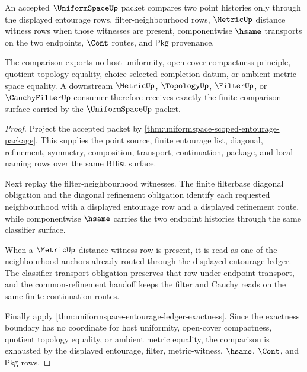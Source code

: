 \begin{theorem}
\label{thm:uniformspace-entourage-filter-metric-comparison}
An accepted $\UniformSpaceUp$ packet compares two point histories only through
the displayed entourage rows, filter-neighbourhood rows, $\MetricUp$ distance
witness rows when those witnesses are present, componentwise $\hsame$
transports on the two endpoints, $\Cont$ routes, and $\mathsf{Pkg}$
provenance.

The comparison exports no host uniformity, open-cover compactness principle,
quotient topology equality, choice-selected completion datum, or ambient
metric space equality. A downstream $\MetricUp$, $\TopologyUp$, $\FilterUp$,
or $\CauchyFilterUp$ consumer therefore receives exactly the finite comparison
surface carried by the $\UniformSpaceUp$ packet.
\end{theorem}
\begin{proof}
Project the accepted packet by
\autoref{thm:uniformspace-scoped-entourage-package}. This supplies the point
source, finite entourage list, diagonal, refinement, symmetry, composition,
transport, continuation, package, and local naming rows over the same
$\mathsf{BHist}$ surface.

Next replay the filter-neighbourhood witnesses. The finite filterbase
diagonal obligation and the diagonal refinement obligation identify each
requested neighbourhood with a displayed entourage row and a displayed
refinement route, while componentwise $\hsame$ carries the two endpoint
histories through the same classifier surface.

When a $\MetricUp$ distance witness row is present, it is read as one of the
neighbourhood anchors already routed through the displayed entourage ledger.
The classifier transport obligation preserves that row under endpoint
transport, and the common-refinement handoff keeps the filter and Cauchy reads
on the same finite continuation routes.

Finally apply
\autoref{thm:uniformspace-entourage-ledger-exactness}. Since the exactness
boundary has no coordinate for host uniformity, open-cover compactness,
quotient topology equality, or ambient metric equality, the comparison is
exhausted by the displayed entourage, filter, metric-witness, $\hsame$,
$\Cont$, and $\mathsf{Pkg}$ rows.
\end{proof}


